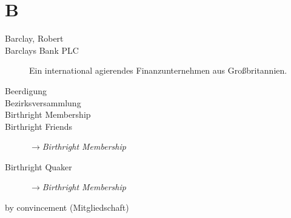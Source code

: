 \section*{B}

\articlesize

\begin{description}

 \item[Barclay, Robert]

 \item[Barclays Bank PLC] Ein international agierendes Finanzunternehmen aus Großbritannien.

 \item[Beerdigung]
 \item[Bezirksversammlung]
 \item[Birthright Membership]
 \item[Birthright Friends] $\to$\textit{Birthright Membership}
 \item[Birthright Quaker] $\to$\textit{Birthright Membership}
 \item[by convincement (Mitgliedschaft)]
 \end{description}

\normalsize

